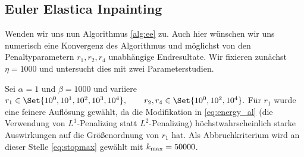 \documentclass{mythesis}
\begin{document}


\subsection*{Euler Elastica Inpainting}

Wenden wir uns nun Algorithmus \ref{alg:ee} zu.
Auch hier wünschen wir uns numerisch eine Konvergenz des Algorithmus und möglichst von den Penaltyparametern $r_1, r_2, r_4$ unabhängige Endresultate.
Wir fixieren zunächst $\eta = 1000$ und untersucht dies mit zwei Parameterstudien.

Sei $\alpha = 1$ und $\beta = 1000$ und variiere
\begin{math}[numbered] \label{eq:num_param}
    r_1 \in \Set{10^0, 10^1, 10^2, 10^3, 10^4}, \qquad
    r_2, r_4 \in \Set{10^0, 10^2, 10^4}.
\end{math}
Für $r_1$ wurde eine feinere Auflösung gewählt, da die Modifikation in \eqref{eq:energy_al} (die Verwendung von $L^1$-Penalizing statt $L^2$-Penalizing) höchstwahrscheinlich starke Auswirkungen auf die Größenordnung von $r_1$ hat.
Als Abbruchkriterium wird an dieser Stelle \eqref{eq:stopmax} gewählt mit $k_{\mathrm{max}} = 50000$.
\end{document}
